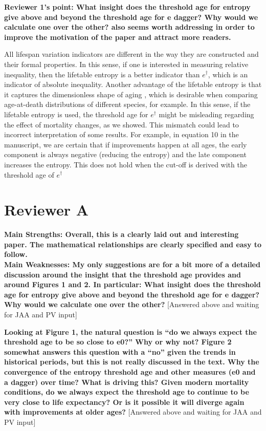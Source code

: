 \documentclass[a4paper,twoside, openright, 12pt, leqno]{article}
\begin{document}
\textbf{Reviewer 1’s point: What insight does the threshold age for entropy give above and beyond the threshold age for e dagger? Why would we calculate one over the other? also seems worth addressing in order to improve the motivation of the paper and attract more readers.
}

All lifespan variation indicators are different in the way they are constructed and their formal properties. In this sense, if one is interested in measuring relative inequality, then the lifetable entropy is a better indicator than $e^\dagger$, which is an indicator of absolute inequality. Another advantage of the lifetable entropy is that it captures the dimensionless shape of aging \citep{colchero2016emergence}, which is desirable when comparing age-at-death distributions of different species, for example. In this sense, if the lifetable entropy is used, the threshold age for $e^\dagger$ might be misleading regarding the effect of mortality changes, as we showed. This mismatch could lead to incorrect interpretation of some results. For example, in equation 10 in the manuscript, we are certain that if improvements happen at all ages, the early component is always negative (reducing the entropy) and the late component increases the entropy. This does not hold when the cut-off is derived with the threshold age of $e^\dagger$


\section*{Reviewer A}
\textbf{Main Strengths:
Overall, this is a clearly laid out and interesting paper. The mathematical relationships are clearly specified and easy to follow.} \\

\textbf{Main Weaknesses:
My only suggestions are for a bit more of a detailed discussion around the insight that the threshold age provides and around Figures 1 and 2. In particular: What insight does the threshold age for entropy give above and beyond the threshold age for e dagger? Why would we calculate one over the other? 
}
[Answered above and waiting for JAA and PV input]
\linebreak

\textbf{Looking at Figure 1, the natural question is “do we always expect the threshold age to be so close to e0?” Why or why not? Figure 2 somewhat answers this question with a “no” given the trends in historical periods, but this is not really discussed in the text. Why the convergence of the entropy threshold age and other measures (e0 and a dagger) over time? What is driving this? Given modern mortality conditions, do we always expect the threshold age to continue to be very close to life expectancy? Or is it possible it will diverge again with improvements at older ages?} 
[Answered above and waiting for JAA and PV input]
\end{document}
